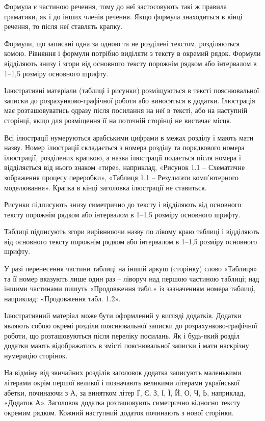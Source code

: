 Формула є частиною речення, тому до неї застосовують такі ж правила граматики, як і до інших членів речення. Якщо формула зна\-хо\-дить\-ся в кінці речення, то після неї ставлять крапку. 

Формули, що записані одна за одною та не розділені текстом, розділяються комою. Рівняння і формули потрібно виділяти з тексту в окремий рядок. Формули відділяють знизу і згори від основного тексту порожнім рядком або інтервалом в 1--1,5 розміру основного шрифту.

Ілюстративні матеріали (таблиці і рисунки) розміщуються в тексті пояснювальної записки до розрахунково-графічної роботи або ви\-но\-сять\-ся в додатки. Ілюстрація має розташовуватись одразу після посилання на неї в тексті, або на наступній сторінці, якщо для розміщення її на поточній сторінці не вистачає місця.

Всі ілюстрації нумеруються арабськими цифрами в межах розділу і мають мати назву. Номер ілюстрації складається з номера розділу та порядкового номера ілюстрації, розділених крапкою, а назва ілюстрації подається після номера і відділяється від нього знаком «тире», на\-прик\-лад, «Рисунок 1.1 -- Схематичне зображення процесу переробки», «Таблиця 1.1 -- Результати комп'ютерного моделювання». Крапка в кінці заголовка ілюстрації не ставиться.

Рисунки підписують знизу симетрично до тексту і відділяють від основного тексту порожнім рядком або інтервалом в 1--1,5 розміру основного шрифту.

Таблиці підписують згори вирівнюючи назву по лівому краю таблиці і відділяють від основного тексту порожнім рядком або інтервалом в 1--1,5 розміру основного шрифту.

У разі перенесення частини таблиці на інший аркуш (сторінку) слово «Таблиця» та її номер вказують лише один раз -- ліворуч над першою частиною таблиці; над іншими частинами пишуть «Продовження табл.» із зазначенням номера таблиці, наприклад: «Продовження табл. 1.2».

Ілюстративний матеріал може бути оформлений у вигляді додатків. Додатки являють собою окремі розділи пояснювальної записки до розрахунково-графічної роботи, що розташовуються після переліку посилань. Як і будь-який розділ додатки мають відображатись в змісті пояснювальної записки і мати наскрізну нумерацію сторінок.

На відміну від звичайних розділів заголовок додатка записують маленькими літерами окрім першої великої і позначають великими літерами української абетки, починаючи з А, за винятком літер Ґ, Є, З, І, Ї, Й, О, Ч, Ь, наприклад, «Додаток А».  Заголовок додатка розташовують симетрично відносно тексту окремим рядком. Кожний наступний додаток починають з нової сторінки.

